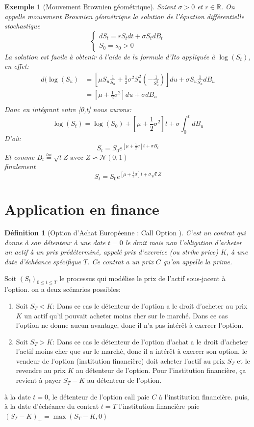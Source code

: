 \documentclass[A4paper,12pt]{report}
\newtheorem{definition}{D\'efinition}[chapter]
\newtheorem{example}{Exemple}[chapter]
\newcommand{\R}{{\mathbb{R}}}
\begin{document}
\begin{example}[Mouvement Brownien géométrique] Soient $\sigma>0$ et $r\in \R$. On appelle mouvement Brownien géométrique la solution de l’équation différentielle stochastique
$$
\left\{\begin{array}{l}
d S_{t}=r S_{t} d t+\sigma S_{t} d B_{t} \\
S_{0}=s_{0}>0
\end{array}\right.
$$
La solution est facile à obtenir à l’aide de la formule d’Ito appliquée à $\log(S_t)$, en effet: 
\begin{align*}
d(\log(S_u)&=\left[\mu S_u \frac{1}{S_u}+ \frac{1}{2}\sigma^2 S_u^2(-\frac{1}{S_u^2})\right]du + \sigma S_u \frac{1}{S_u}dB_u\\
&= \left[ \mu + \frac{1}{2} \sigma^2 \right]du + \sigma dB_u\\
\end{align*}
Donc en intégrant entre [0,t] nous aurons:
$$\log(S_t) = \log(S_0) + \left[ \mu +\frac{1}{2} \sigma^2\right]t + \sigma \int_0^t dB_u $$
D'où: $$S_t = S_0 e^{[\mu +\frac{1}{2}\sigma]t+\sigma B_t}$$
Et comme $ B_t \stackrel{l o i}{=} \sqrt{t} Z \text{ avec } Z \backsim \mathcal{N}(0,1)$\\
finalement $$S_t = S_0 e^{[\mu +\frac{1}{2}\sigma]t+\sigma \sqrt{t}Z}$$
\end{example}

\section{Application en finance}
\begin{definition}[Option d'Achat Européenne : Call Option ]
C'est un contrat qui donne à son détenteur à une date $t=0$ le droit mais non l'obligation d'acheter un actif à un prix prédéterminé, appelé prix d'exercice (ou strike price) $K$, à une date d'échéance spécifique $T$. Ce contrat a un prix $C$ qu'on appelle la prime.
\end{definition}

Soit $\left(S_{t}\right)_{0 \leq t \leq T}$ le processus qui modélise le prix de l'actif sous-jacent à l'option. on a deux scénarios possibles:

\begin{enumerate}
  \item Soit $S_{T}<K$:
Dans ce cas le détenteur de l'option a le droit d'acheter au prix $K$ un actif qu'il pouvait acheter moins cher sur le marché. Dans ce cas l'option ne donne aucun avantage, donc il n'a pas intérêt à exercer l'option.
  \item Soit $S_{T}>K$:
Dans ce cas le détenteur de l'option d'achat a le droit d'acheter l'actif moins cher que sur le marché, donc il a intérêt à exercer son option, le vendeur de l'option (institution financière) doit acheter l'actif au prix $S_{T}$ et le revendre au prix $K$ au détenteur de l'option.
Pour l'institution financière, ça revient à payer $S_{T}-K$ au détenteur de l'option.
\end{enumerate}
à la date $t=0$, le détenteur de l'option call paie $C$ à l'institution financière. puis, à la date d'échéance du contrat $t=T$ l'institution financière paie $\left(S_{T}-K\right)_{+}=\max \left(S_{T}-K, 0\right)$
\end{document}

